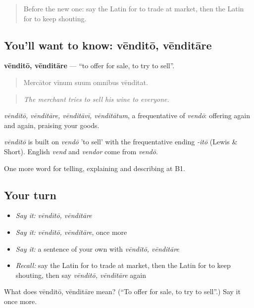 \begin{quote}
Before the new one: say the Latin for to trade at market, then the Latin for to keep shouting.
\end{quote}

\subsection*{You'll want to know: vēnditō, vēnditāre}
\textbf{vēnditō, vēnditāre} — \textquotedblleft{}to offer for sale, to try to sell\textquotedblright{}.

\begin{quote}
Mercātor vīnum suum omnibus vēnditat.
\end{quote}

\begin{quote}
\emph{The merchant tries to sell his wine to everyone.}
\end{quote}

\emph{vēnditō, vēnditāre, vēnditāvī, vēnditātum}, a frequentative of \emph{vendō}: offering again and again, praising your goods.

\begin{cousinweb}
\emph{vēnditō} is built on \emph{vendō} 'to sell' with the frequentative ending \emph{-itō} (Lewis \& Short). English \emph{vend} and \emph{vendor} come from \emph{vendō}.
\end{cousinweb}

\begin{grammarlens}[title={What you've built}]
One more word for telling, explaining and describing at B1.
\end{grammarlens}

\subsection*{Your turn}
\begin{itemize}
\raggedright
  \item \emph{Say it:} \emph{vēnditō, vēnditāre}
  \item \emph{Say it:} \emph{vēnditō, vēnditāre}, once more
  \item \emph{Say it:} a sentence of your own with \emph{vēnditō, vēnditāre}
  \item \emph{Recall:} say the Latin for to trade at market, then the Latin for to keep shouting, then say \emph{vēnditō, vēnditāre} again
\end{itemize}

\begin{tcolorbox}[breakable,colback=teal!4,colframe=teal!35!black,title={Before you move on}]
What does vēnditō, vēnditāre mean? (\textquotedblleft{}To offer for sale, to try to sell\textquotedblright{}.) Say it once more.
\end{tcolorbox}
